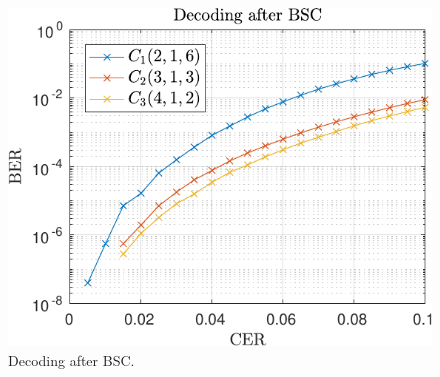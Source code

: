 
\begin{figure}
\centering
\includegraphics[scale=1]{../figures/randomErrors-crop.pdf} 
\caption{Decoding after BSC.}
\end{figure}

